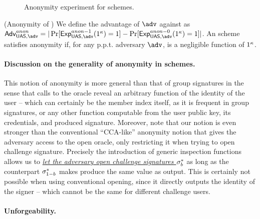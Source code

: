 \begin{figure}[htp!]
  \caption{Anonymity experiment for \UAS schemes.}
  \label{fig:exp-uas-anonb}
\end{figure}

\begin{definition}{(Anonymity of \UAS)}
  We define the advantage \AdvAnon of $\adv$ against \ExpAnonb as
  $\AdvAnon=|\Pr\lbrack\ExpAnono(1^\secpar)=1\rbrack-
  \Pr\lbrack\ExpAnonz(1^\secpar)=1\rbrack|$.
  An \UAS scheme satisfies anonymity if, for any p.p.t. adversary $\adv$,
  \AdvAnon is a negligible function of $1^\kappa$.
\end{definition}

\paragraph{Discussion on the generality of anonymity in \UAS schemes.} %
This notion of anonymity is more general than that of group signatures in the
sense that calls to the \INSPECT oracle reveal an arbitrary function of the
identity of the user -- which can certainly be the member index itself, as it
is frequent in group signatures, or any other function computable from the
user public key, its credentials, and produced signature. Moreover, note that
our notion is even stronger than the conventional ``CCA-like'' anonymity notion
that gives the adversary access to the open oracle, only restricting it when
trying to open challenge signature. Precisely the introduction of generic
inspection functions allows us to \uline{\emph{let the adversary open
    challenge signatures $\mathsf{\sigma}^*_b$}} as long as the counterpart $\mathsf{\sigma}^*_{1-b}$
makes \Inspect produce the same \y value as output. This is certainly not
possible when using conventional opening, since it directly outputs the identity
of the signer -- which cannot be the same for different challenge users.

\paragraph{Unforgeability.}

